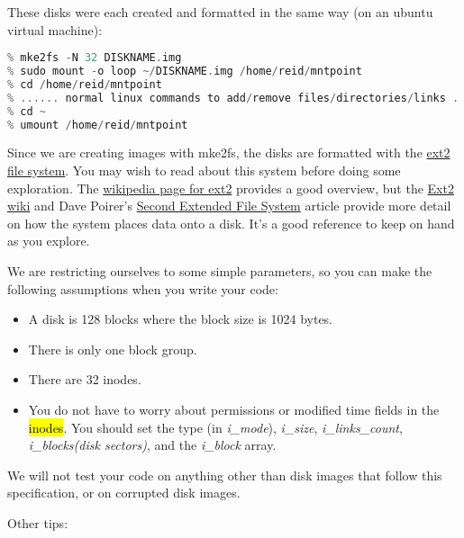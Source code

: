 \documentclass[12pt]{article}
\begin{document}
\bigskip

These disks were each created and formatted in the same way (on an ubuntu virtual machine):

\bigskip

\begin{lstlisting}[language=C]
% dd if=/dev/zero of=~/DISKNAME.img bs=1024 count=128
% mke2fs -N 32 DISKNAME.img
% sudo mount -o loop ~/DISKNAME.img /home/reid/mntpoint
% cd /home/reid/mntpoint
% ...... normal linux commands to add/remove files/directories/links .....
% cd ~
% umount /home/reid/mntpoint
\end{lstlisting}

\bigskip

Since we are creating images with mke2fs, the disks are formatted with the \href{https://en.wikipedia.org/wiki/Ext2}{ext2
file system}. You may wish to read about this system before doing some exploration.
The \href{http://en.wikipedia.org/wiki/Ext2}{wikipedia page for ext2} provides a
good overview, but the \href{http://wiki.osdev.org/Ext2}{Ext2 wiki} and Dave
Poirer's \href{http://www.nongnu.org/ext2-doc/index.html}{Second Extended File System}
article provide more detail on how the system places data onto a disk. It's a good
reference to keep on hand as you explore.

\bigskip

We are restricting ourselves to some simple parameters, so you can make the
following assumptions when you write your code:

\bigskip

\begin{itemize}
    \item A disk is 128 blocks where the block size is 1024 bytes.
    \item There is only one block group.
    \item There are 32 inodes.
    \item You do not have to worry about permissions or modified time fields in
    the \hl{inodes}. You should set the type (in \textit{i\_mode}), \textit{i\_size},
    \textit{i\_links\_count}, \textit{i\_blocks(disk sectors)}, and the \textit{i\_block}
    array.
\end{itemize}

We will not test your code on anything other than disk images that follow this
specification, or on corrupted disk images.

Other tips:
\end{document}
